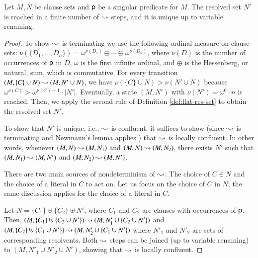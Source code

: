 \begin{rep}
\begin{lemma}
   \label{lem:flat-res-set-termination-confluence}
   Let $M, N$ be clause sets and $\mathsf{p}$ be a singular predicate for
   $M$. The resolved set $N'$ is reached in a finite number of $\mathbin\leadsto$ steps,
   and it is unique up to variable renaming.
\end{lemma}
\begin{proof}
   To show $\mathbin\leadsto$ is terminating we use the following ordinal measure on
   clause sets: $\nu(\{D_1,\dotsc,\allowbreak D_n\}) = \omega^{\nu(D_1)} \oplus
   \cdots \oplus \omega^{\nu(D_n)}$, where $\nu(D)$ is the number of
   occurrences of $\mathsf{p}$ in $D$, $\omega$ is the first infinite ordinal, and
   $\oplus$ is the Hessenberg, or natural, sum, which is commutative.
   For every transition
   $(M, \{C\} \cup N) \mathbin\leadsto (M, N' \cup N)$, we have $\nu(\{C\} \cup N) > \nu(N' \cup N)$
   because $\omega^{\nu(C)} > \omega^{\nu(C)-1} \cdot |N'|$.
   Eventually, a state $(M,N')$ with $\nu(N')=\omega^0\cdot n$ is reached.
   Then, we apply the second rule of Definition \ref{def:flat-res-set} to obtain the resolved set $N'$.

   To show that $N'$ is unique, i.e., $\mathbin\leadsto$ is confluent, it suffices
   to show (since $\mathbin\leadsto$ is terminating and Newmann's lemma applies
   \cite{bn-98-tr-and-all-that}) that $\mathbin\leadsto$ is locally confluent. In
   other words, whenever $(M,N) \mathbin\leadsto (M, N_1)$ and $(M,N) \mathbin\leadsto
   (M, N_2)$, there exists $N'$ such that $(M, N_1) \mathbin\leadsto (M, N')$ and
   $(M, N_2) \mathbin\leadsto (M,N')$. 
   
   There are two main sources of nondeterminism of $\mathbin\leadsto$: The choice of $C
   \in N$ and the choice of a literal in $C$ to act on. Let us focus on the choice of
   $C$ in $N$; the same discussion applies for the choice of a literal in $C$.

   Let $N = \{C_1\} \uplus \{C_2\} \uplus N'$, where $C_1$ and $C_2$ are
   clauses with occurrences of $\mathsf{p}$. Then, $(M, \{C_1\} \uplus \{ C_2 \cup
   N' \}) \mathbin\leadsto (M, N'_1 \cup \{ C_2 \cup N'\})$ and $(M, \{C_2\} \uplus
   \{C_1 \cup N' \}) \mathbin\leadsto (M, N'_2 \cup \{ C_1 \cup N' \})$ where $N'_1$ and
   $N'_2$ are sets of corresponding resolvents. Both $\mathbin\leadsto$ steps can
   be joined (up to variable renaming) to $(M, N'_1 \cup N'_2 \cup N')$, showing
   that $\mathbin\leadsto$ is locally confluent.
\end{proof}
\end{rep}

